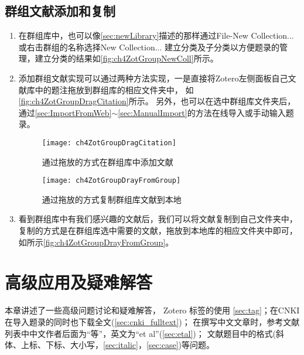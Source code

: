 \documentclass[cn,11pt,chinese]{elegantbook}
\begin{document}
\section{群组文献添加和复制}\label{sec:copyGroupLibrary}
\begin{enumerate}
	\item 在群组库中，也可以像\cref{sec:newLibrary}描述的那样通过File-New Collection...或右击群组的名称选择New Collection...
	建立分类及子分类以方便题录的管理，建立分类的结果如\autoref{fig:ch4ZotGroupNewColl}所示。
	\item 添加群组文献实现可以通过两种方法实现，一是直接将Zotero左侧面板自己文献库中的题注拖放到群组库的相应文件夹中，
	如\autoref{fig:ch4ZotGroupDragCitation}所示。
	另外，也可以在选中群组库文件夹后，通过\cref{sec:ImportFromWeb}$\sim$\cref{sec:ManualImport}的方法在线导入或手动输入题录。
		\begin{figure}[htbp]
			\centering
			\texttt{[image: ch4ZotGroupDragCitation]}
			\caption{通过拖放的方式在群组库中添加文献}
			\label{fig:ch4ZotGroupDragCitation}
		\end{figure}

			\begin{figure}[htbp]
			\centering
			\texttt{[image: ch4ZotGroupDrayFromGroup]}
			\caption{通过拖放的方式复制群组库文献到本地}
			\label{fig:ch4ZotGroupDrayFromGroup}
			\end{figure}
		\item 看到群组库中有我们感兴趣的文献后，我们可以将文献复制到自己文件夹中，
		复制的方式是在群组库选中需要的文献，拖放到本地库的相应文件夹中即可，
		如所示\autoref{fig:ch4ZotGroupDrayFromGroup}。
	\end{enumerate}

  \chapter{高级应用及疑难解答}\label{ch:questions}
	本章讲述了一些高级问题讨论和疑难解答，
	Zotero 标签的使用 \cref{sec:tag}；在CNKI在导入题录的同时也下载全文(\cref{sec:cnki_fulltext})；
	在撰写中文文章时，参考文献列表中中文作者后面为“等”，英文为“et al”(\cref{sec:etal})；
	文献题目中的格式(斜体、上标、下标、大小写，\cref{sec:italic}，\cref{sec:case})等问题。
		
\end{document}
